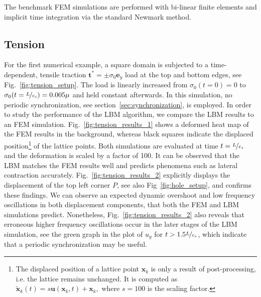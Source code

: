 \documentclass{article}
\renewcommand{\vec}{\boldsymbol}        %
\begin{document}
The benchmark FEM simulations are performed with bi-linear finite elements and implicit time integration via the standard Newmark method.


\subsection{Tension}



For the first numerical example, a square domain is subjected to a time-dependent, tensile traction $\boldsymbol{t}^*=\pm{\sigma}_0\boldsymbol{e}_y$ load at the top and bottom edges, see Fig.~\ref{fig:tension_setup}. The load is linearly increased from $\sigma_0(t=0)=0$ to \mbox{$\sigma_0(t=\nicefrac{L}{c_s})=0.005\mu$} and held constant afterwards. In this simulation, no periodic synchronization, see section~\ref{sec:synchronization}, is employed. In order to study the performance of the LBM algorithm, we compare the LBM results to an FEM simulation. Fig.~\ref{fig:tension_results_1} shows a deformed heat map of the FEM results in the background, whereas black squares indicate the displaced position\footnote{The displaced position of a lattice point $\vec{x}_k$ is only a result of post-processing, i.e. the lattice remains unchanged. It is computed as $\tilde{\vec{x}}_k(t) = s\vec{u}(\vec{x}_k,t)+\vec{x}_k,$ where $s=100$ is the scaling factor.} of the lattice points. Both simulations are evaluated at time $t=\nicefrac{L}{c_s}$ and the deformation is scaled by a factor of 100. 
It can be observed that the LBM matches the FEM results well and predicts phenomena such as lateral contraction accurately. Fig.~\ref{fig:tension_results_2} explicitly displays the displacement of the top left corner $P$, see also Fig~\ref{fig:hole_setup}, and confirms these findings. We can observe an expected dynamic overshoot and low frequency oscillations in both displacement components, that both the FEM and LBM simulations predict. Nonetheless, Fig.~\ref{fig:tension_results_2} also reveals that erroneous higher frequency oscillations occur in the later stages of the LBM simulation, see the green graph in the plot of $u_y$ for $t>1.5\nicefrac{L}{c_s}$, which indicate that a periodic synchronization may be useful.
\end{document}
